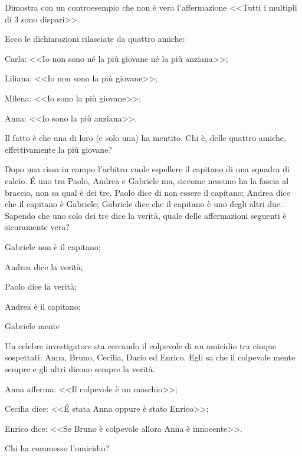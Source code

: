 \begin{esercizio}
\label{ese:6.16}
 Dimostra con un controesempio che non è vera l'affermazione <<Tutti
i multipli di 3 sono dispari>>.
\end{esercizio}

\begin{esercizio}
\label{ese:6.17}
Ecco le dichiarazioni rilasciate da quattro amiche: 
\begin{description*}
\item Carla: <<Io non sono né la più giovane né la più anziana>>; 
\item Liliana: <<Io non sono la più giovane>>;
\item Milena: <<Io sono la più giovane>>;
\item Anna: <<Io sono la più anziana>>.
\end{description*}
Il fatto è che una di loro (e solo una) ha mentito. Chi è, delle quattro amiche, effettivamente la più giovane?
\end{esercizio}

\begin{esercizio}
\label{ese:6.18}
Dopo una rissa in campo l'arbitro vuole espellere
il capitano di una squadra di calcio. É uno tra
Paolo, Andrea e Gabriele ma, siccome nessuno ha la fascia al braccio,
non sa qual è dei tre. Paolo dice di non essere il capitano; Andrea
dice che il capitano è Gabriele; Gabriele dice che il capitano è uno
degli altri due. Sapendo che uno solo dei tre dice la verità, quale
delle affermazioni seguenti è sicuramente vera?
\begin{multicols}{2}
\begin{enumeratea}
\item Gabriele non è il capitano;
\item Andrea dice la verità;
\item Paolo dice la verità;
\item Andrea è il capitano;
\item Gabriele mente
\end{enumeratea}
\end{multicols}
\end{esercizio}

\begin{esercizio}
\label{ese:6.19}
Un celebre investigatore sta cercando il colpevole di un omicidio
tra cinque sospettati: Anna, Bruno, Cecilia, Dario ed Enrico. Egli sa
che il colpevole mente sempre e gli altri dicono sempre la verità. 
\begin{description*}
\item Anna afferma: <<Il colpevole è un maschio>>;
\item Cecilia dice: <<É stata Anna oppure è stato Enrico>>;
\item Enrico dice: <<Se Bruno è colpevole allora Anna è innocente>>.
\end{description*}
Chi ha commesso l'omicidio?
\end{esercizio}


